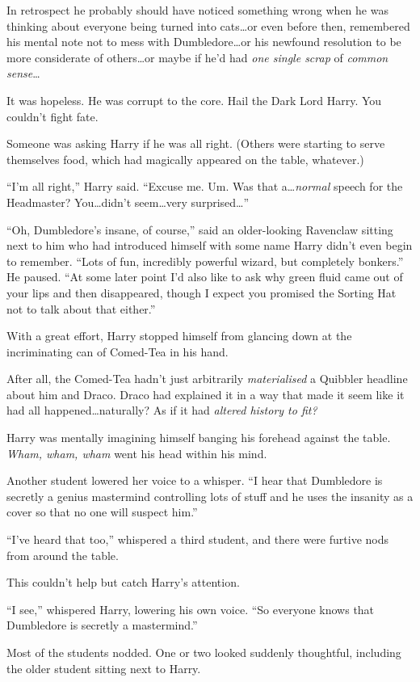 In retrospect he probably should have noticed something wrong when he was thinking about everyone being turned into cats…or even before then, remembered his mental note not to mess with Dumbledore…or his newfound resolution to be more considerate of others…or maybe if he’d had \emph{one single scrap} of \emph{common sense}…

It was hopeless. He was corrupt to the core. Hail the Dark Lord Harry. You couldn’t fight fate.

Someone was asking Harry if he was all right. (Others were starting to serve themselves food, which had magically appeared on the table, whatever.)

“I’m all right,” Harry said. “Excuse me. Um. Was that a…\emph{normal} speech for the Headmaster? You…didn’t seem…very surprised…”

“Oh, Dumbledore’s insane, of course,” said an older-looking Ravenclaw sitting next to him who had introduced himself with some name Harry didn’t even begin to remember. “Lots of fun, incredibly powerful wizard, but completely bonkers.” He paused. “At some later point I’d also like to ask why green fluid came out of your lips and then disappeared, though I expect you promised the Sorting Hat not to talk about that either.”

With a great effort, Harry stopped himself from glancing down at the incriminating can of Comed-Tea in his hand.

After all, the Comed-Tea hadn’t just arbitrarily \emph{materialised} a Quibbler headline about him and Draco. Draco had explained it in a way that made it seem like it had all happened…naturally? As if it had \emph{altered history to fit?}

Harry was mentally imagining himself banging his forehead against the table. \emph{Wham, wham, wham} went his head within his mind.

Another student lowered her voice to a whisper. “I hear that Dumbledore is secretly a genius mastermind controlling lots of stuff and he uses the insanity as a cover so that no one will suspect him.”

“I’ve heard that too,” whispered a third student, and there were furtive nods from around the table.

This couldn’t help but catch Harry’s attention.

“I see,” whispered Harry, lowering his own voice. “So everyone knows that Dumbledore is secretly a mastermind.”

Most of the students nodded. One or two looked suddenly thoughtful, including the older student sitting next to Harry.

